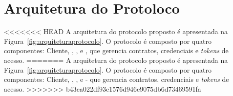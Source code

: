 


\section{Arquitetura do Protoloco}\label{sec:ArqProtocolo}

<<<<<<< HEAD
A arquitetura do protocolo proposto é apresentada na Figura~\ref{fig:arquiteturaprotocolo}. O protocolo é composto por quatro componentes: Cliente, \servidorAA, \servidorRest, e \servidorBD, que gerencia contratos, credenciais e \emph{tokens} de acesso.
=======
A arquitetura do protocolo proposto é apresentada na Figura~\ref{fig:arquiteturaprotocolo}. O protocolo é composto por quatro componentes: Cliente, \servidorAA, \servidorRest, e \servidorBD- que gerencia contratos, credenciais e \emph{tokens} de acesso.
>>>>>>> b43ca022df93c1576d946e9075db6d73469591fa

